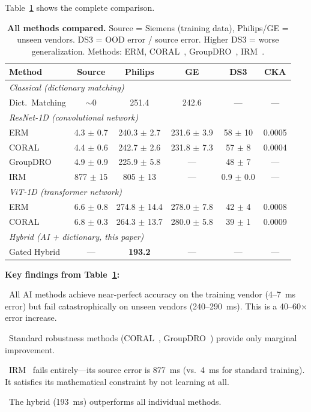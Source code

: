 \documentclass[11pt,a4paper]{article}
\begin{document}
Table~\ref{tab:main} shows the complete comparison.

\begin{table}[ht]
\centering
\caption{\textbf{All methods compared.} Source = Siemens (training
data), Philips/GE = unseen vendors. DS3 = OOD error / source error.
Higher DS3 = worse generalization. Methods: ERM, CORAL~\cite{sun2016deep},
GroupDRO~\cite{sagawa2020distributionally}, IRM~\cite{arjovsky2019invariant}.}
\label{tab:main}
\begin{tabular}{@{}lccccc@{}}
\toprule
\textbf{Method} & \textbf{Source} & \textbf{Philips} & \textbf{GE} &
\textbf{DS3} & \textbf{CKA} \\
\midrule
\multicolumn{6}{l}{\textit{Classical (dictionary matching)}} \\
Dict.\ Matching & $\sim$0 & 251.4 & 242.6 & --- & --- \\
\midrule
\multicolumn{6}{l}{\textit{ResNet-1D (convolutional network)}} \\
ERM     & 4.3 $\pm$ 0.7 & 240.3 $\pm$ 2.7 & 231.6 $\pm$ 3.9 & 58 $\pm$ 10 & 0.0005 \\
CORAL   & 4.4 $\pm$ 0.6 & 242.7 $\pm$ 2.6 & 231.8 $\pm$ 7.3 & 57 $\pm$ 8  & 0.0004 \\
GroupDRO & 4.9 $\pm$ 0.9 & 225.9 $\pm$ 5.8 & --- & 48 $\pm$ 7 & --- \\
IRM     & 877 $\pm$ 15 & 805 $\pm$ 13 & --- & 0.9 $\pm$ 0.0 & --- \\
\midrule
\multicolumn{6}{l}{\textit{ViT-1D (transformer network)}} \\
ERM     & 6.6 $\pm$ 0.8 & 274.8 $\pm$ 14.4 & 278.0 $\pm$ 7.8 & 42 $\pm$ 4 & 0.0008 \\
CORAL   & 6.8 $\pm$ 0.3 & 264.3 $\pm$ 13.7 & 280.0 $\pm$ 5.8 & 39 $\pm$ 1 & 0.0009 \\
\midrule
\multicolumn{6}{l}{\textit{Hybrid (AI + dictionary, this paper)}} \\
Gated Hybrid & --- & \textbf{193.2} & --- & --- & --- \\
\bottomrule
\end{tabular}
\end{table}

\begin{mdframed}[style=insightbox]
\textbf{Key findings from Table~\ref{tab:main}:}

\textbullet~All AI methods achieve near-perfect accuracy on the training
vendor (4--7~ms error) but fail catastrophically on unseen vendors
(240--290~ms). This is a 40--60$\times$ error increase.

\textbullet~Standard robustness methods (CORAL~\cite{sun2016deep},
GroupDRO~\cite{sagawa2020distributionally}) provide only
marginal improvement.

\textbullet~IRM~\cite{arjovsky2019invariant} fails entirely---its source error is 877~ms (vs.\ 4~ms
for standard training). It satisfies its mathematical constraint by
not learning at all.

\textbullet~The hybrid (193~ms) outperforms all individual methods.
\end{mdframed}
\end{document}
